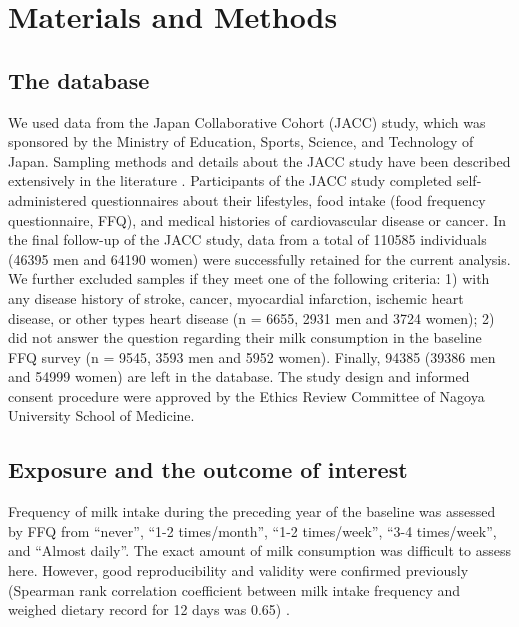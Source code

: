 \documentclass[nutrients,article,submitted,moreauthors,pdftex]{mdpi}
\begin{document}
\hypertarget{materials-and-methods}{%
\section{Materials and Methods}\label{materials-and-methods}}

\hypertarget{the-database}{%
\subsection{The database}\label{the-database}}

We used data from the Japan Collaborative Cohort (JACC) study, which was
sponsored by the Ministry of Education, Sports, Science, and Technology
of Japan. Sampling methods and details about the JACC study have been
described extensively in the literature
\citep{Ohno2001, Tamakoshi2005, Tamakoshi2013}. Participants of the JACC
study completed self-administered questionnaires about their lifestyles,
food intake (food frequency questionnaire, FFQ), and medical histories
of cardiovascular disease or cancer. In the final follow-up of the JACC
study, data from a total of 110585 individuals (46395 men and 64190
women) were successfully retained for the current analysis. We further
excluded samples if they meet one of the following criteria: 1) with any
disease history of stroke, cancer, myocardial infarction, ischemic heart
disease, or other types heart disease (n = 6655, 2931 men and 3724
women); 2) did not answer the question regarding their milk consumption
in the baseline FFQ survey (n = 9545, 3593 men and 5952 women). Finally,
94385 (39386 men and 54999 women) are left in the database. The study
design and informed consent procedure were approved by the Ethics Review
Committee of Nagoya University School of Medicine.

\hypertarget{exposure-and-the-outcome-of-interest}{%
\subsection{Exposure and the outcome of
interest}\label{exposure-and-the-outcome-of-interest}}

Frequency of milk intake during the preceding year of the baseline was
assessed by FFQ from ``never'', ``1-2 times/month'', ``1-2 times/week'',
``3-4 times/week'', and ``Almost daily''. The exact amount of milk
consumption was difficult to assess here. However, good reproducibility
and validity were confirmed previously (Spearman rank correlation
coefficient between milk intake frequency and weighed dietary record for
12 days was 0.65) \citep{Date2005}.
\end{document}
